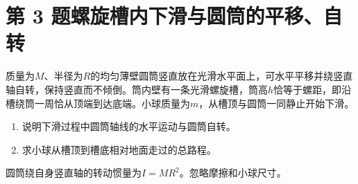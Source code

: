 \documentclass[UTF8,fontset=fandol,a4paper,11pt]{ctexart}
\begin{document}
\section*{第 3 题\quad 螺旋槽内下滑与圆筒的平移、自转}\label{q:3}


质量为$M$、半径为$R$的均匀薄壁圆筒竖直放在光滑水平面上，可水平平移并绕竖直轴自转，保持竖直而不倾倒。筒内壁有一条光滑螺旋槽，筒高$h$恰等于螺距，即沿槽绕筒一周恰从顶端到达底端。小球质量为$m$，从槽顶与圆筒一同静止开始下滑。
\begin{enumerate}
\item 说明下滑过程中圆筒轴线的水平运动与圆筒自转。
\item 求小球从槽顶到槽底相对地面走过的总路程。
\end{enumerate}
圆筒绕自身竖直轴的转动惯量为$I=MR^2$。忽略摩擦和小球尺寸。
\end{document}
